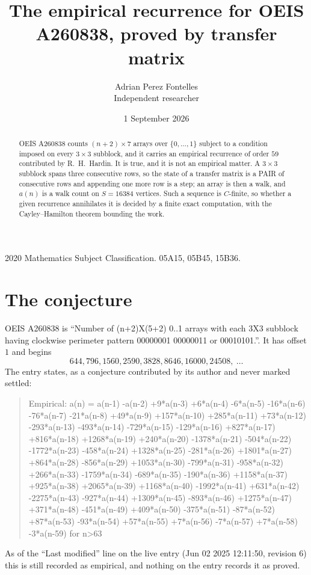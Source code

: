 \documentclass[11pt,a4paper]{article}
\title{The empirical recurrence for OEIS A260838, proved by transfer matrix}
\author{Adrian Perez Fontelles\\ \small Independent researcher}
\date{1 September 2026}
\theoremstyle{plain}
\theoremstyle{definition}
\begin{document}
\maketitle

\begin{abstract}
OEIS A260838 counts $(n+2)\times7$ arrays over $\{0,\dots,1\}$ subject to a condition imposed on
every $3\times3$ subblock, and it carries an empirical recurrence of order $59$
contributed by R.~H.~Hardin. It is true, and it is not an empirical matter. A $3\times3$
subblock spans three consecutive rows, so the state of a transfer matrix is a PAIR of
consecutive rows and appending one more row is a step; an array is then a walk, and
$a(n)$ is a walk count on $S=16384$ vertices. Such a sequence is $C$-finite, so whether a given
recurrence annihilates it is decided by a finite exact computation, with the Cayley--Hamilton
theorem bounding the work.
\end{abstract}

\noindent\small 2020 Mathematics Subject Classification. 05A15, 05B45, 15B36.\normalsize

\section{The conjecture}

OEIS A260838 is ``Number of (n+2)X(5+2) 0..1 arrays with each 3X3 subblock having clockwise perimeter pattern 00000001 00000011 or 00010101.''. It has offset $1$ and begins
\[
644, 796, 1560, 2590, 3828, 8646, 16000, 24508,\ \dots
\]
The entry states, as a conjecture contributed by its author and never marked settled:
\begin{quote}
Empirical: a(n) = a(n-1) -a(n-2) +9*a(n-3) +6*a(n-4) -6*a(n-5) -16*a(n-6) -76*a(n-7) -21*a(n-8) +49*a(n-9) +157*a(n-10) +285*a(n-11) +73*a(n-12) -293*a(n-13) -493*a(n-14) -729*a(n-15) -129*a(n-16) +827*a(n-17) +816*a(n-18) +1268*a(n-19) +240*a(n-20) -1378*a(n-21) -504*a(n-22) -1772*a(n-23) -458*a(n-24) +1328*a(n-25) -281*a(n-26) +1801*a(n-27) +864*a(n-28) -856*a(n-29) +1053*a(n-30) -799*a(n-31) -958*a(n-32) +266*a(n-33) -1759*a(n-34) -689*a(n-35) -190*a(n-36) +1158*a(n-37) +925*a(n-38) +2065*a(n-39) +1168*a(n-40) -1992*a(n-41) +631*a(n-42) -2275*a(n-43) -927*a(n-44) +1309*a(n-45) -893*a(n-46) +1275*a(n-47) +371*a(n-48) -451*a(n-49) +409*a(n-50) -375*a(n-51) -87*a(n-52) +87*a(n-53) -93*a(n-54) +57*a(n-55) +7*a(n-56) -7*a(n-57) +7*a(n-58) -3*a(n-59) for n>63
\end{quote}
As of the ``Last modified'' line on the live entry (Jun 02 2025 12:11:50, revision 6) this is still
recorded as empirical, and nothing on the entry records it as proved.
\end{document}
